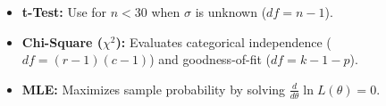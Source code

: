 \documentclass[10pt,a4paper]{article}
\begin{document}
\begin{keytake}
\begin{itemize}
  \item \textbf{t-Test:} Use for $n < 30$ when $\sigma$ is unknown ($df = n-1$).
  \item \textbf{Chi-Square ($\chi^2$):} Evaluates categorical independence ($df = (r-1)(c-1)$) and goodness-of-fit ($df = k - 1 - p$).
  \item \textbf{MLE:} Maximizes sample probability by solving $\frac{d}{d\theta}\ln L(\theta) = 0$.
\end{itemize}
\end{keytake}
\end{document}
